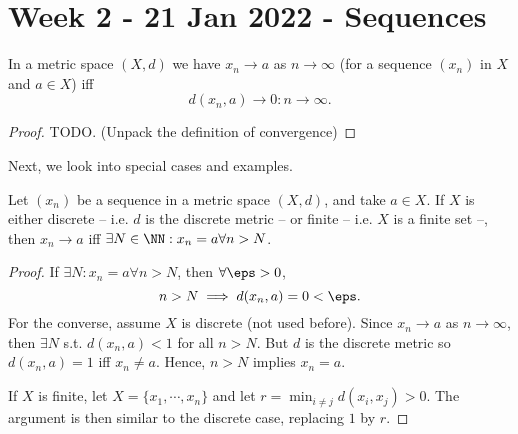 \section{Week 2 - 21 Jan 2022 - Sequences}
\begin{proposition}
  In a metric space $(X,d)$ we have $x_n\to a$ as $n\to\infty$ (for a sequence
  $(x_n)$ in $X$ and $a\in X$) iff 
  \[d(x_n,a) \to 0 : n\to\infty.\]
  \label{prop:convergenceMetric}
\end{proposition}
\begin{proof}
  TODO. (Unpack the definition of convergence)
\end{proof}

Next, we look into special cases and examples. 
\begin{proposition}
  Let $(x_n)$ be a sequence in a metric space $(X,d)$, and take $a\in X$. If $X$
  is either discrete -- i.e. $d$ is the discrete metric -- or finite -- i.e. $X$
  is a finite set --, then $x_n\to a$ iff $\exists N\in\NN : x_n=a \forall n>N$.
  \label{<+label+>}
\end{proposition}
\begin{proof}
  If $\exists N : x_n=a \forall n>N$, then $\forall \eps>0$, 
  \[n>N \implies d(x_n,a)=0<\eps.\]
  For the converse, assume $X$ is discrete (not used before). Since $x_n\to a$
  as $n\to\infty$, then $\exists N$ s.t. $d(x_n,a)< 1$ for all $n>N$. But $d$ is
  the discrete metric so $d(x_n,a)=1$ iff $x_n\neq a$. Hence, $n>N$ implies
  $x_n=a$.

  If $X$ is finite, let $X=\{x_1,\cdots, x_n\}$ and let $r=\min_{i\neq j}
  d(x_i,x_j)>0$. The argument is then similar to the discrete case, replacing
  $1$ by $r$.
\end{proof}

